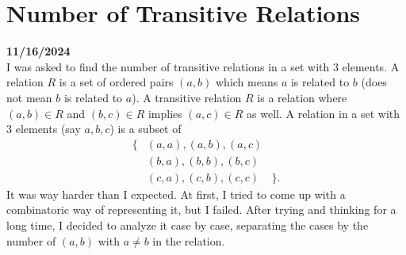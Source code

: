 \documentclass[12pt, oneside]{article}
\begin{document}
\section*{Number of Transitive Relations}
\textbf{11/16/2024}\\
I was asked to find the number of transitive relations in a set with 3 elements. A relation $R$ is a set of ordered pairs $(a, b)$ which means $a$ is related to $b$ (does not mean $b$ is related to $a$). A transitive relation $R$ is a relation where $(a, b) \in R$ and $(b, c) \in R$ implies $(a, c) \in R$ as well. A relation in a set with 3 elements (say $a, b, c$) is a subset of
\begin{eqnarray*}
\{&(a, a), (a, b), (a, c)&\\
&(b, a), (b, b), (b, c)&\\
&(c, a), (c, b), (c, c)&\}.
\end{eqnarray*}
It was way harder than I expected. At first, I tried to come up with a combinatoric way of representing it, but I failed. After trying and thinking for a long time, I decided to analyze it case by case, separating the cases by the number of $(a, b)$ with $a \neq b$ in the relation.\\
\end{document}

